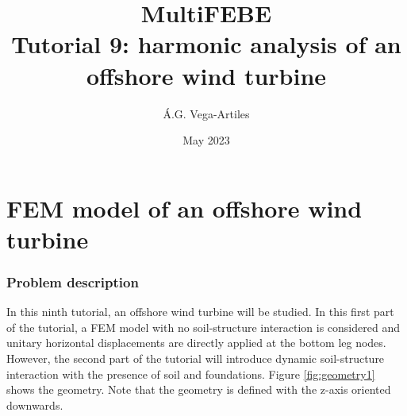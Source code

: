 \documentclass[a4]{article}
\title{MultiFEBE \\ Tutorial 9: harmonic analysis of an offshore wind turbine}
\author{\'A.G. Vega-Artiles}
\date{May 2023}
\begin{document}
\maketitle

\tableofcontents

\part{FEM model of an offshore wind turbine}

\section{Problem description}

In this ninth tutorial, an offshore wind turbine will be studied. In this first part of the tutorial, a FEM model with no soil-structure interaction is considered and unitary horizontal displacements are directly applied at the bottom leg nodes. However, the second part of the tutorial will introduce dynamic soil-structure interaction with the presence of soil and foundations. Figure \ref{fig:geometry1} shows the geometry. Note that the geometry is defined with the z-axis oriented downwards.
\end{document}
